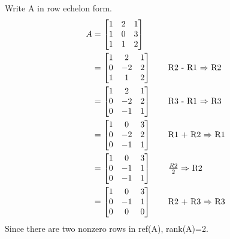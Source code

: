 \section{}

\subsection{}
Write A in row echelon form.
\begin{align*}
    A
    &= \begin{bmatrix}
	1 & 2 & 1 \\
	1 & 0 & 3 \\
	1 & 1 & 2
    \end{bmatrix} \\
    &= \begin{bmatrix}
	1 & 2 & 1 \\
	0 & -2 & 2 \\
	1 & 1 & 2
    \end{bmatrix} \tag*{R2 - R1 $\Rightarrow$ R2} \\
    &= \begin{bmatrix}
	1 & 2 & 1 \\
	0 & -2 & 2 \\
	0 & -1 & 1
    \end{bmatrix} \tag*{R3 - R1 $\Rightarrow$ R3} \\
    &= \begin{bmatrix}
	1 & 0 & 3 \\
	0 & -2 & 2 \\
	0 & -1 & 1
    \end{bmatrix} \tag*{R1 + R2 $\Rightarrow$ R1} \\
    &= \begin{bmatrix}
	1 & 0 & 3 \\
	0 & -1 & 1 \\
	0 & -1 & 1
    \end{bmatrix} \tag*{$\frac{R2}{2} \Rightarrow$ R2} \\
    &= \begin{bmatrix}
	1 & 0 & 3 \\
	0 & -1 & 1 \\
	0 & 0 & 0
    \end{bmatrix} \tag*{R2 + R3 $\Rightarrow$ R3}
\end{align*}
Since there are two nonzero rows in ref(A), rank(A)=2.

